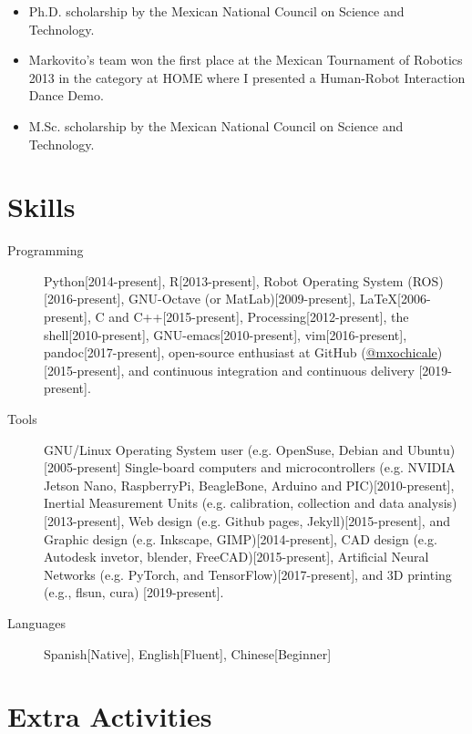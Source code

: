 \documentclass{mycv}
\begin{document}
\begin{itemize}
\item Ph.D. scholarship by the Mexican National Council on Science and Technology. 

\item Markovito's team  won the first place at the Mexican Tournament of Robotics 2013 in the category at HOME where I presented a Human-Robot Interaction Dance Demo. \href{https://www.youtube.com/watch?v=Kw-lZam_qZI}{\faYoutube} 

\item M.Sc. scholarship by the Mexican National Council on Science and Technology. 
\end{itemize}

\section{Skills}
\begin{description}
  \item[Programming] Python[2014-present],
R[2013-present], 
Robot Operating System (ROS)[2016-present],
GNU-Octave (or MatLab)[2009-present],
\LaTeX [2006-present], 
C and C++[2015-present],
Processing[2012-present], 
the shell[2010-present], 
GNU-emacs[2010-present],
vim[2016-present], 
pandoc[2017-present],
open-source enthusiast at GitHub (\href{https://github.com/mxochicale}{@mxochicale})[2015-present], 
and continuous integration and continuous delivery [2019-present]. 
  \item[Tools] 
GNU/Linux Operating System user (e.g. OpenSuse, Debian and Ubuntu)[2005-present]
Single-board computers and microcontrollers (e.g. 
NVIDIA Jetson Nano, RaspberryPi, BeagleBone, Arduino and PIC)[2010-present],
Inertial Measurement Units (e.g. calibration, collection and data analysis)[2013-present], 
Web design (e.g. Github pages, Jekyll)[2015-present], and
Graphic design (e.g. Inkscape, GIMP)[2014-present],
CAD design (e.g. Autodesk invetor, blender, FreeCAD)[2015-present], 
Artificial Neural Networks (e.g. PyTorch, and TensorFlow)[2017-present], and
3D printing (e.g., flsun, cura) [2019-present].
  \item[Languages] Spanish[Native], English[Fluent], Chinese[Beginner]
\end{description}



\section{Extra Activities}
\end{document}
